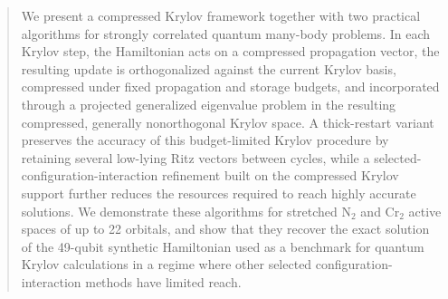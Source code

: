 \begin{abstract}
We present a compressed Krylov framework together with two practical algorithms
for strongly correlated quantum many-body problems. In each Krylov step, the
Hamiltonian acts on a compressed propagation vector, the resulting update is
orthogonalized against the current Krylov basis, compressed under fixed
propagation and storage budgets, and incorporated through a projected
generalized eigenvalue problem in the resulting compressed, generally
nonorthogonal Krylov space. A thick-restart variant preserves the accuracy of
this budget-limited Krylov procedure by retaining several low-lying Ritz
vectors between cycles, while a selected-configuration-interaction refinement
built on the compressed Krylov support further reduces the resources required
to reach highly accurate solutions. We demonstrate these algorithms for
stretched N$_2$ and Cr$_2$ active spaces of up to 22 orbitals, and show that
they recover the exact solution of the 49-qubit synthetic Hamiltonian used as
a benchmark for quantum Krylov calculations in a regime where other selected
configuration-interaction methods have limited reach.
\end{abstract}
